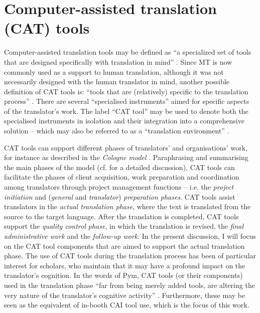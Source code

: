 \section{Computer-assisted translation (CAT) tools}

Computer-assisted translation tools may be defined as ``a specialized set of tools that are designed specifically with translation in mind'' \citep[504]{o2013impact}. Since MT is now commonly used as a support to human translation, although it was not necessarily designed with the human translator in mind, another possible definition of CAT tools is: ``tools that are (relatively) specific to the translation process'' \citep[121]{kruger2016contextualising}. There are several “specialised instruments” aimed for specific aspects of the translator’s work. The label “CAT tool” may be used to denote both the specialised instruments in isolation and their integration into a comprehensive solution – which may also be referred to as a ``translation environment'' \citep[1]{coppers2018intellingo}.

CAT tools can support different phases of translators’ and organisations’ work, for instance as described in the \textit{Cologne model} \citep{kruger2016contextualising,kruger2016fachubersetzen}. Paraphrasing and summarising the main phases of the model (cf. \cite{kruger2016contextualising,kruger2016fachubersetzen} for a detailed discussion), CAT tools can facilitate the phases of client acquisition, work preparation and coordination among translators through project management functions -- i.e. the \textit{project initiation} and (\textit{general} and \textit{translator}) \textit{preparation phases}. CAT tools assist translators in the \textit{actual translation phase}, where the text is translated from the source to the target language. After the translation is completed, CAT tools support the \textit{quality control phase}, in which the translation is revised, the \textit{final administrative work} and the \textit{follow-up work}. In the present discussion, I will focus on the CAT tool components that are aimed to support the actual translation phase. The use of CAT tools during the translation process has been of particular interest for scholars, who maintain that it may have a profound impact on the translator’s cognition. In the words of Pym, CAT tools (or their components) used in the translation phase ``far from being merely added tools, are altering the very nature of the translator’s cognitive activity'' \citep[1]{pym2011technology}. Furthermore, these may be seen as the equivalent of in-booth CAI tool use, which is the focus of this work.

